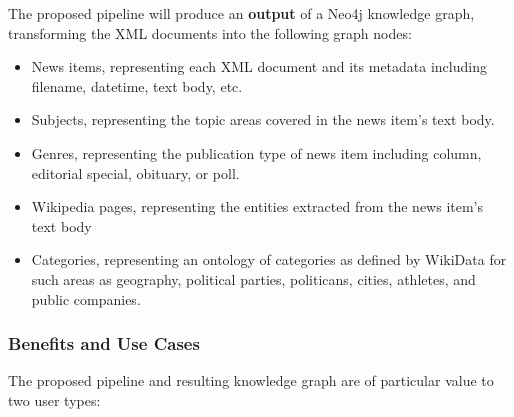 \documentclass[11pt]{article}
\begin{document}
The proposed pipeline will produce an \textbf{output} of a Neo4j knowledge graph, transforming the XML documents into the following graph nodes:
\begin{itemize}
  \item{News items, representing each XML document and its metadata including filename, datetime, text body, etc.}
  \item{Subjects, representing the topic areas covered in the news item's text body.}
  \item{Genres, representing the publication type of news item including column, editorial special, obituary, or poll.}
  \item{Wikipedia pages, representing the entities extracted from the news item's text body}
  \item{Categories, representing an ontology of categories as defined by WikiData for such areas as geography, political parties, politicans, cities, athletes, and public companies.}
\end{itemize}

\subsubsection{Benefits and Use Cases}
The proposed pipeline and resulting knowledge graph are of particular value to two user types:
\end{document}

